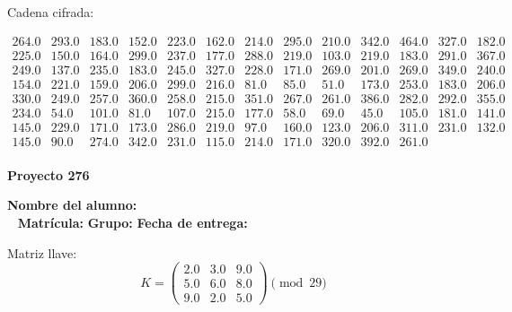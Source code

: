\documentclass[12pt]{article}
\begin{document}
Cadena cifrada:
\begin{center}
$\begin{array}{lllllllllllll}
264.0 & 293.0 & 183.0 & 152.0 & 223.0 & 162.0 & 214.0 & 295.0 & 210.0 & 342.0 & 464.0 & 327.0 & 182.0\\
225.0 & 150.0 & 164.0 & 299.0 & 237.0 & 177.0 & 288.0 & 219.0 & 103.0 & 219.0 & 183.0 & 291.0 & 367.0\\
249.0 & 137.0 & 235.0 & 183.0 & 245.0 & 327.0 & 228.0 & 171.0 & 269.0 & 201.0 & 269.0 & 349.0 & 240.0\\
154.0 & 221.0 & 159.0 & 206.0 & 299.0 & 216.0 & 81.0 & 85.0 & 51.0 & 173.0 & 253.0 & 183.0 & 206.0\\
330.0 & 249.0 & 257.0 & 360.0 & 258.0 & 215.0 & 351.0 & 267.0 & 261.0 & 386.0 & 282.0 & 292.0 & 355.0\\
234.0 & 54.0 & 101.0 & 81.0 & 107.0 & 215.0 & 177.0 & 58.0 & 69.0 & 45.0 & 105.0 & 181.0 & 141.0\\
145.0 & 229.0 & 171.0 & 173.0 & 286.0 & 219.0 & 97.0 & 160.0 & 123.0 & 206.0 & 311.0 & 231.0 & 132.0\\
145.0 & 90.0 & 274.0 & 342.0 & 231.0 & 115.0 & 214.0 & 171.0 & 320.0 & 392.0 & 261.0\\
\end{array}$
\end{center}

\newpage


\textbf{Proyecto 276}

\textbf{Nombre del alumno:} \underline{\hspace{13cm}}\\\
\vspace{1cm}
\textbf{Matrícula:} \underline{\hspace{4cm}} \hspace{1cm}
\textbf{Grupo:} \underline{\hspace{2cm}}
\textbf{Fecha de entrega:} \underline{\hspace{2cm}}

\medskip

Matriz llave:
\[
K = \begin{pmatrix}
2.0 & 3.0 & 9.0\\
5.0 & 6.0 & 8.0\\
9.0 & 2.0 & 5.0
\end{pmatrix} \pmod{29}
\]
\end{document}
